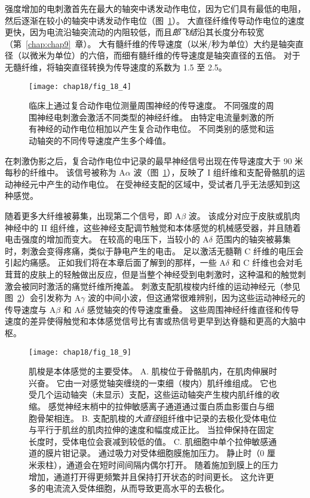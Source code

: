 强度增加的电刺激首先在最大的轴突中诱发动作电位，因为它们具有最低的电阻，然后逐渐在较小的轴突中诱发动作电位（图~\ref{fig:18_4}）。
大直径纤维传导动作电位的速度更快，因为电流沿轴突流动的内阻较低，而且\textit{郎飞结}沿其长度分布较宽（第~\ref{chap:chap9}~章）。
大有髓纤维的传导速度（以米/秒为单位）大约是轴突直径（以微米为单位）的六倍，而细有髓纤维的传导速度是轴突直径的五倍。
对于无髓纤维，将轴突直径转换为传导速度的系数为 1.5 至 2.5。


\begin{figure}[htbp]
	\centering
	\texttt{[image: chap18/fig\_18\_4]}
	\caption{临床上通过复合动作电位测量周围神经的传导速度。
		不同强度的周围神经电刺激会激活不同类型的神经纤维。
		由特定电流量刺激的所有神经的动作电位相加以产生复合动作电位。
		不同类别的感觉和运动轴突的不同传导速度产生多个峰值\cite{erlanger2016electrical}。}
	\label{fig:18_4}
\end{figure}


在刺激伪影之后，复合动作电位中记录的最早神经信号出现在传导速度大于 90 米每秒的纤维中。
该信号被称为 A$\alpha$ 波（图~\ref{fig:18_4}），反映了 I 组纤维和支配骨骼肌的运动神经元中产生的动作电位。
在受神经支配的区域中，受试者几乎无法感知到这种感觉。


随着更多大纤维被募集，出现第二个信号，即 A$\beta$ 波。
该成分对应于皮肤或肌肉神经中的 II 组纤维，这些神经支配调节触觉和本体感觉的机械感受器，并且随着电击强度的增加而变大。
在较高的电压下，当较小的 A$\delta$ 范围内的轴突被募集时，刺激会变得疼痛，类似于静电产生的电击。
足以激活无髓鞘 C 纤维的电压会引起灼痛感。
正如我们将在本章后面了解到的那样，一些 A$\delta$ 和 C 纤维也会对毛茸茸的皮肤上的轻触做出反应，但是当整个神经受到电刺激时，这种温和的触觉刺激会被同时激活的痛觉纤维所掩盖。
刺激支配肌梭梭内纤维的运动神经元（参见图~\ref{fig:18_9}）会引发称为 A$\gamma$ 波的中间小波，但这通常很难辨别，因为这些运动神经元的传导速度与 A$\beta$ 和 A$\delta$ 感觉轴突的传导速度重叠。
这些周围神经纤维直径和传导速度的差异使得触觉和本体感觉信号比有害或热信号更早到达脊髓和更高的大脑中枢。


\begin{figure}[htbp]
	\centering
	\texttt{[image: chap18/fig\_18\_9]}
	\caption{肌梭是本体感觉的主要受体。
		A. 肌梭位于骨骼肌内，在肌肉伸展时兴奋。
		它由一对感觉轴突缠绕的一束细（梭内）肌纤维组成。
		它也受几个运动轴突（未显示）支配，这些运动轴突产生梭内肌纤维的收缩。
		感觉神经末梢中的拉伸敏感离子通道通过蛋白质血影蛋白与细胞骨架相连\cite{sachs1992stretch}。
		B. 支配肌梭的\textit{大直径}组纤维中记录的去极化受体电位与平行于肌丝的肌肉拉伸的速度和幅度成正比。 
		当拉伸保持在固定长度时，受体电位会衰减到较低的值\cite{cone1971transducer}。
		C. 肌细胞中单个拉伸敏感通道的膜片钳记录。
		通过吸力对受体细胞膜施加压力。
		静止时（0 厘米汞柱），通道会在短时间间隔内偶尔打开。 
		随着施加到膜上的压力增加，通道打开得更频繁并且保持打开状态的时间更长。
		这允许更多的电流流入受体细胞，从而导致更高水平的去极化\cite{guharay1984stretch}。}
	\label{fig:18_9}
\end{figure}


